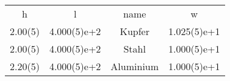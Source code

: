 \begin{tabular}{cccc}
\hline
h & l & name & w \\
2.00(5) & 4.000(5)e+2 & Kupfer & 1.025(5)e+1 \\
2.00(5) & 4.000(5)e+2 & Stahl & 1.000(5)e+1 \\
2.20(5) & 4.000(5)e+2 & Aluminium & 1.000(5)e+1 \\
\hline
\end{tabular}
